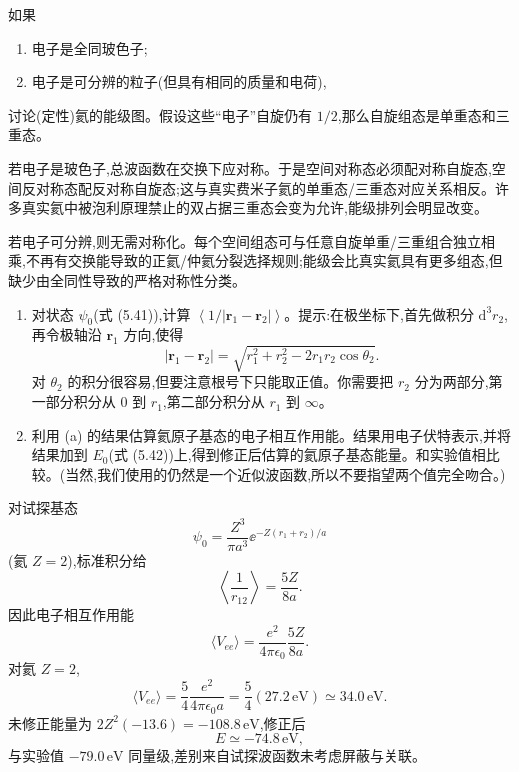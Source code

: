 \begin{question}
如果
\begin{enumerate}
\item 电子是全同玻色子;
\item 电子是可分辨的粒子(但具有相同的质量和电荷),
\end{enumerate}
讨论(定性)氦的能级图。假设这些“电子”自旋仍有 $1/2$,那么自旋组态是单重态和三重态。
\end{question}
\begin{solution}

若电子是玻色子,总波函数在交换下应对称。于是空间对称态必须配对称自旋态,空间反对称态配反对称自旋态;这与真实费米子氦的单重态/三重态对应关系相反。许多真实氦中被泡利原理禁止的双占据三重态会变为允许,能级排列会明显改变。

若电子可分辨,则无需对称化。每个空间组态可与任意自旋单重/三重组合独立相乘,不再有交换能导致的正氦/仲氦分裂选择规则;能级会比真实氦具有更多组态,但缺少由全同性导致的严格对称性分类。

\end{solution}

\begin{question}
\begin{enumerate}
\item 对状态 $\psi_0$(式 (5.41)),计算 $\left\langle 1/|\mathbf r_1-\mathbf r_2|\right\rangle$。提示:在极坐标下,首先做积分 $\mathrm d^3r_2$,再令极轴沿 $\mathbf r_1$ 方向,使得
\[
|\mathbf r_1-\mathbf r_2|=\sqrt{r_1^2+r_2^2-2r_1r_2\cos\theta_2}.
\]
对 $\theta_2$ 的积分很容易,但要注意根号下只能取正值。你需要把 $r_2$ 分为两部分,第一部分积分从 $0$ 到 $r_1$,第二部分积分从 $r_1$ 到 $\infty$。
\item 利用 (a) 的结果估算氦原子基态的电子相互作用能。结果用电子伏特表示,并将结果加到 $E_0$(式 (5.42))上,得到修正后估算的氦原子基态能量。和实验值相比较。(当然,我们使用的仍然是一个近似波函数,所以不要指望两个值完全吻合。)
\end{enumerate}

\par\smallskip
{}

\end{question}
\begin{solution}

对试探基态
\[
\psi_0=\frac{Z^3}{\pi a^3}\ee^{-Z(r_1+r_2)/a}
\]
(氦 $Z=2$),标准积分给
\[
\left\langle\frac1{r_{12}}\right\rangle=\frac{5Z}{8a}.
\]
因此电子相互作用能
\[
\langle V_{ee}\rangle=\frac{e^2}{4\pi\epsilon_0}\frac{5Z}{8a}.
\]
对氦 $Z=2$,
\[
\langle V_{ee}\rangle=\frac54\frac{e^2}{4\pi\epsilon_0a}=\frac54(27.2\,\mathrm{eV})\simeq34.0\,\mathrm{eV}.
\]
未修正能量为 $2Z^2(-13.6)=-108.8\,\mathrm{eV}$,修正后
\[
E\simeq -74.8\,\mathrm{eV},
\]
与实验值 $-79.0\,\mathrm{eV}$ 同量级,差别来自试探波函数未考虑屏蔽与关联。

\end{solution}

